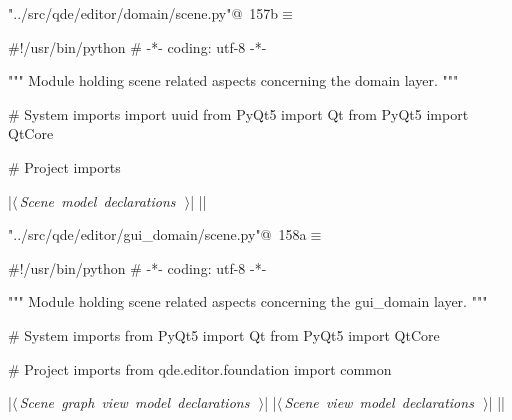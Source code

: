 \documentclass[%
    a4paper,    %
    justified,  %
    nobib,      %
    openany     %
]{tufte-book}
\begin{document}
\begin{flushleft} \small
\begin{minipage}{\linewidth}\label{scrap169}\raggedright\small
{} \verb@"../src/qde/editor/domain/scene.py"@\nobreak\ {\footnotesize {157b}}$\equiv$
\vspace{-1ex}
\begin{pythoncode}
#!/usr/bin/python
# -*- coding: utf-8 -*-

""" Module holding scene related aspects concerning the domain layer. """

# System imports
import uuid
from PyQt5 import Qt
from PyQt5 import QtCore

# Project imports


|\hbox{$\langle\,${\itshape Scene model declarations}\nobreak\ {\footnotesize {}}$\,\rangle$}|
|\NWsep|
\end{pythoncode}
\vspace{1.5ex}
\footnotesize
\begin{list}{}{\setlength{\itemsep}{-\parsep}\setlength{\itemindent}{-\leftmargin}}

\item{}
\end{list}
\end{minipage}\vspace{4ex}
\end{flushleft}
\begin{flushleft} \small
\begin{minipage}{\linewidth}\label{scrap170}\raggedright\small
{} \verb@"../src/qde/editor/gui_domain/scene.py"@\nobreak\ {\footnotesize {158a}}$\equiv$
\vspace{-1ex}
\begin{pythoncode}

#!/usr/bin/python
# -*- coding: utf-8 -*-

""" Module holding scene related aspects concerning the gui_domain layer. """

# System imports
from PyQt5 import Qt
from PyQt5 import QtCore

# Project imports
from qde.editor.foundation import common

|\hbox{$\langle\,${\itshape Scene graph view model declarations}\nobreak\ {\footnotesize {}}$\,\rangle$}|
|\hbox{$\langle\,${\itshape Scene view model declarations}\nobreak\ {\footnotesize {}}$\,\rangle$}|
|\NWsep|
\end{pythoncode}
\vspace{1.5ex}
\footnotesize
\begin{list}{}{\setlength{\itemsep}{-\parsep}\setlength{\itemindent}{-\leftmargin}}

\item{}
\end{list}
\end{minipage}\vspace{4ex}
\end{flushleft}
\end{document}
